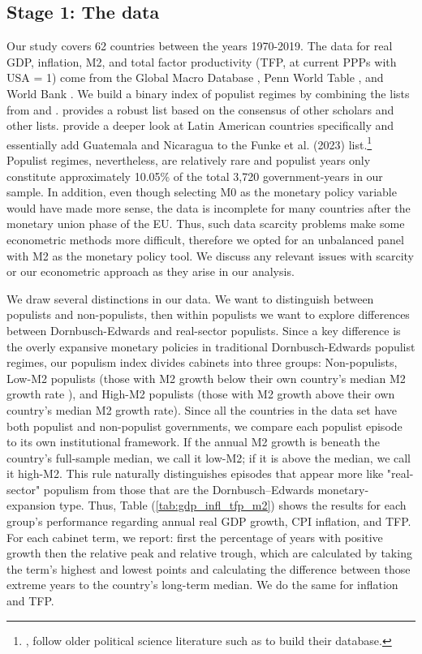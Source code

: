 \documentclass{OUP-EJ}
\begin{document}
\subsection{Stage 1: The data}

Our study covers 62 countries between the years 1970-2019. The data for real GDP, inflation, M2, and total factor productivity (TFP, at current PPPs with USA = 1) come from the Global Macro Database \cite{GMD2025}, Penn World Table \cite{PennWorldTable}, and World Bank \cite{HaEtAl2023}. We build a binary index of populist regimes by combining the lists from \cite{BallFreytag2019} and \cite{FunkeEtAl2023}. \cite{FunkeEtAl2023} provides a robust list based on the consensus of other scholars and other lists.  \cite{BallFreytag2019} provide a deeper look at Latin American countries specifically and essentially add Guatemala and Nicaragua to the Funke et al. (2023) list.\footnote{\cite{BallFreytag2019}, follow older political science literature such as \cite{Weyland2001} to build their database.} Populist regimes, nevertheless, are relatively rare and populist years only constitute approximately 10.05\% of the total 3,720 government-years in our sample. In addition, even though selecting M0 as the monetary policy variable would have made more sense, the data is incomplete for many countries after the monetary union phase of the EU. Thus, such data scarcity problems make some econometric methods more difficult, therefore we opted for an unbalanced panel with M2 as the monetary policy tool. We discuss any relevant issues with scarcity or our econometric approach as they arise in our analysis. 

We draw several distinctions in our data.  We want to distinguish between populists and non-populists, then within populists we want to explore differences between Dornbusch-Edwards and real-sector populists.  Since a key difference is the overly expansive monetary policies in traditional Dornbusch-Edwards populist regimes, our populism index divides cabinets into three groups: Non-populists, Low-M2 populists (those with M2 growth below their own country’s median M2 growth rate ), and High-M2 populists (those with M2 growth above their own country’s median M2 growth rate). Since all the countries in the data set have both populist and non-populist governments, we compare each populist episode to its own institutional framework. If the annual M2 growth is beneath the country's full-sample median, we call it low-M2; if it is above the median, we call it high-M2. This rule naturally distinguishes episodes that appear more like "real-sector" populism from those that are the Dornbusch–Edwards monetary-expansion type. Thus, Table (\ref{tab:gdp_infl_tfp_m2}) shows the results for each group's performance regarding annual real GDP growth, CPI inflation, and TFP. For each cabinet term, we report: first the percentage of years with positive growth then the relative peak and relative trough, which are calculated by taking the term's highest and lowest points and calculating the difference between those extreme years to the country's long-term median. We do the same for inflation and TFP. 
\end{document}

